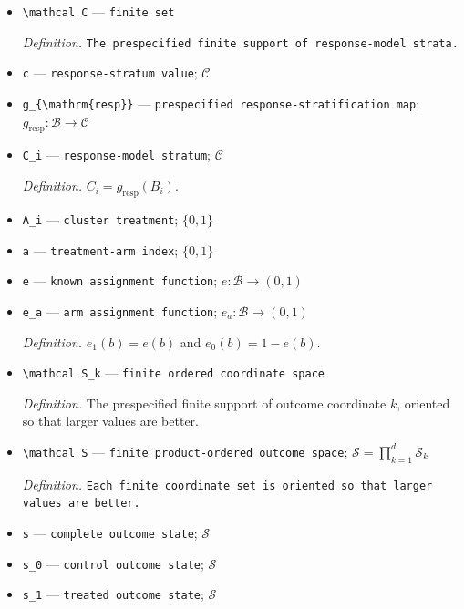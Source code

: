 \documentclass{article}
\begin{document}
\begin{itemize}
  \item \texttt{\textbackslash{}\allowbreak{}mathcal C} --- \texttt{finite set}
  \par\smallskip\noindent\emph{Definition.} \texttt{The prespecified finite support of response-\allowbreak{}model strata.}
  \item \texttt{c} --- \texttt{response-\allowbreak{}stratum value}; \(\mathcal C\)
  \item \texttt{g\_\allowbreak{}\{\textbackslash{}\allowbreak{}mathrm\{resp\}\allowbreak{}\}\allowbreak{}} --- \texttt{prespecified response-\allowbreak{}stratification map}; \(g_{\mathrm{resp}}:\mathcal B\to\mathcal C\)
  \item \texttt{C\_\allowbreak{}i} --- \texttt{response-\allowbreak{}model stratum}; \(\mathcal C\)
  \par\smallskip\noindent\emph{Definition.} \(C_i=g_{\mathrm{resp}}(B_i)\).
  \item \texttt{A\_\allowbreak{}i} --- \texttt{cluster treatment}; \(\{0,1\}\)
  \item \texttt{a} --- \texttt{treatment-\allowbreak{}arm index}; \(\{0,1\}\)
  \item \texttt{e} --- \texttt{known assignment function}; \(e:\mathcal B\to(0,1)\)
  \item \texttt{e\_\allowbreak{}a} --- \texttt{arm assignment function}; \(e_a:\mathcal B\to(0,1)\)
  \par\smallskip\noindent\emph{Definition.} \(e_1(b)=e(b)\) and \(e_0(b)=1-e(b)\).
  \item \texttt{\textbackslash{}\allowbreak{}mathcal S\_\allowbreak{}k} --- \texttt{finite ordered coordinate space}
  \par\smallskip\noindent\emph{Definition.} The prespecified finite support of outcome coordinate \(k\), oriented so that larger values are better.
  \item \texttt{\textbackslash{}\allowbreak{}mathcal S} --- \texttt{finite product-\allowbreak{}ordered outcome space}; \(\mathcal S=\prod_{k=1}^{d}\mathcal S_k\)
  \par\smallskip\noindent\emph{Definition.} \texttt{Each finite coordinate set is oriented so that larger values are better.}
  \item \texttt{s} --- \texttt{complete outcome state}; \(\mathcal S\)
  \item \texttt{s\_\allowbreak{}0} --- \texttt{control outcome state}; \(\mathcal S\)
  \item \texttt{s\_\allowbreak{}1} --- \texttt{treated outcome state}; \(\mathcal S\)

\end{itemize}
\end{document}
